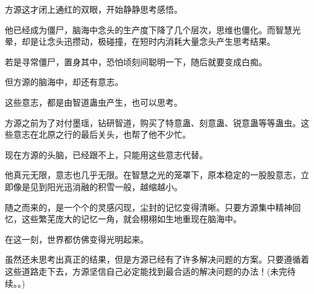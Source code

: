 \begin{this_body}
方源这才闭上通红的双眼，开始静静思考感悟。

他已经成为僵尸，脑海中念头的生产度下降了几个层次，思维也僵化。而智慧光晕，却是让念头迅攒动，极碰撞，在短时内消耗大量念头产生思考结果。

若是寻常僵尸，置身其中，恐怕顷刻间聪明一下，随后就要变成白痴。

但方源的脑海中，却还有意志。

这些意志，都是由智道蛊虫产生，也可以思考。

方源之前为了对付墨瑶，钻研智道，购买了特意蛊、刻意蛊、锐意蛊等等蛊虫。这些意志在北原之行的最后关头，也帮了他不少忙。

现在方源的头脑，已经跟不上，只能用这些意志代替。

他真元无限，意志也几乎无限。在智慧之光的笼罩下，原本稳定的一股股意志，立即像是见到阳光迅消融的积雪一般，越缩越小。

随之而来的，是一个个的灵感闪现，尘封的记忆变得清晰。只要方源集中精神回忆，这些繁芜庞大的记忆一角，就会栩栩如生地重现在脑海中。

在这一刻，世界都仿佛变得光明起来。

虽然还未思考出真正的结果，但是方源已经有了许多解决问题的方案。只要遵循着这些道路走下去，方源坚信自己必定能找到最合适的解决问题的办法！(未完待续。。)

\end{this_body}

